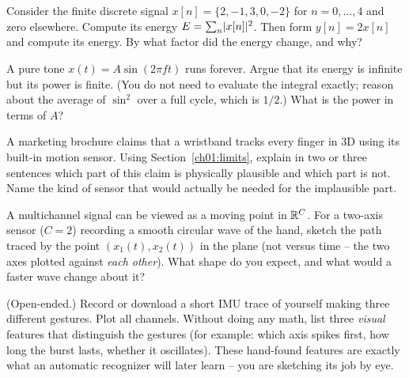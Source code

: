 \begin{exercise}
Consider the finite discrete signal $x[n] = \{2, -1, 3, 0, -2\}$ for $n=0,\dots,4$ and zero
elsewhere. Compute its energy $E=\sum_n \lvert x[n]\rvert^2$. Then form $y[n]=2x[n]$ and compute its
energy. By what factor did the energy change, and why?
\end{exercise}

\begin{exercise}
A pure tone $x(t)=A\sin(2\pi f t)$ runs forever. Argue that its energy is infinite but its power
is finite. (You do not need to evaluate the integral exactly; reason about the average of
$\sin^2$ over a full cycle, which is $1/2$.) What is the power in terms of $A$?
\end{exercise}

\begin{exercise}
A marketing brochure claims that a wristband tracks every finger in 3D using its built-in motion
sensor. Using Section~\ref{ch01:limits}, explain in two or three sentences
which part of this claim is physically plausible and which part is not. Name the
kind of sensor that would actually be needed for the implausible part.
\end{exercise}

\begin{exercise}
\label{ch01:ex-trajectory}
A multichannel signal can be viewed as a moving point in $\mathbb{R}^C$. For a two-axis sensor
($C=2$) recording a smooth circular wave of the hand, sketch the path traced by the point
$(x_1(t),x_2(t))$ in the plane (not versus time -- the two axes plotted against \emph{each
other}). What shape do you expect, and what would a faster wave change about it?
\end{exercise}

\begin{exercise}
(Open-ended.) Record or download a short IMU trace of yourself making three different gestures.
Plot all channels. Without doing any math, list three \emph{visual} features that distinguish the
gestures (for example: which axis spikes first, how long the burst lasts, whether it oscillates).
These hand-found features are exactly what an automatic recognizer will later learn -- you are
sketching its job by eye.
\end{exercise}
